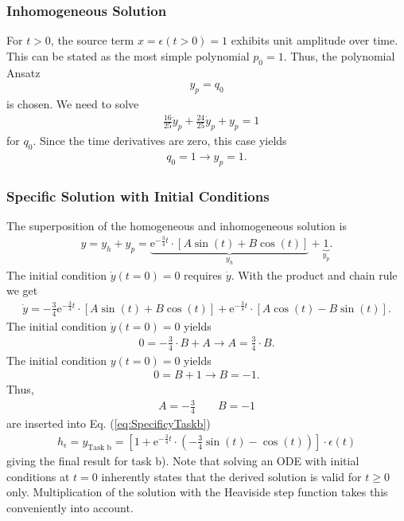 \documentclass[a4paper,11pt,oneside]{scrartcl}
\newcommand{\eq}[1]{Eq. (\ref{#1})}
\begin{document}
\subsubsection{Inhomogeneous Solution}
For $t>0$, the source term $x=\epsilon(t>0)=1$ exhibits unit
amplitude over time. This can be stated as the most simple polynomial $p_0=1$.
Thus, the polynomial Ansatz
\begin{align}
y_p = q_0
\end{align}
is chosen.
We need to solve
\begin{align}
&\frac{16}{25} \ddot{y}_p + \frac{24}{25} \dot{y}_p + y_p = 1
\end{align}
for $q_0$.
Since the time derivatives are zero, this case yields
\begin{align}
q_0 = 1 \rightarrow  y_p = 1.
\end{align}

\subsubsection{Specific Solution with Initial Conditions}
The superposition of the homogeneous and inhomogeneous solution is
\begin{align}
\label{eq:SpecificyTaskb}
y = y_h + y_p = \underbrace{
\mathrm{e}^{-\frac{3}{4} t} \cdot
\left[ A \sin(t) + B  \cos(t)\right]}_{y_h} +\underbrace{1}_{y_p}.
\end{align}
The initial condition $\dot{y}(t=0) = 0$ requires $\dot{y}$.
With the product and chain rule we get
\begin{align}
\dot{y}
=
-\frac{3}{4}\mathrm{e}^{-\frac{3}{4} t} \cdot
\left[ A \sin(t) + B \cos(t)\right]
+
\mathrm{e}^{-\frac{3}{4} t} \cdot
\left[ A \cos(t)  - B \sin(t)\right].
\end{align}
The initial condition $\dot{y}(t=0) = 0$ yields
\begin{align}
0 = -\frac{3}{4}\cdot B + A \rightarrow A = \frac{3}{4}\cdot B.
\end{align}
The initial condition ${y}(t=0) = 0$ yields
\begin{align}
0 = B  + 1 \rightarrow B = -1.
\end{align}
Thus,
\begin{align}
A = -\frac{3}{4}\qquad B = -1
\end{align}
are inserted into \eq{eq:SpecificyTaskb}
\begin{align}
\boxed{
h_\epsilon = y_\text{Task b} =
[1 + \mathrm{e}^{-\frac{3}{4} t} \cdot
\left(- \frac{3}{4} \sin(t) - \cos(t)\right)] \cdot \epsilon(t)
}
\end{align}
giving the final result for task b).
Note that solving an ODE with initial conditions at $t=0$ inherently states
that the derived solution is valid for $t\geq 0$ only.
Multiplication of the solution with the Heaviside step function takes this
conveniently into account.
\end{document}
